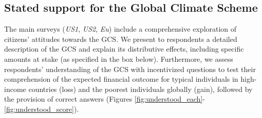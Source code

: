 \begin{bibunit}



\subsection{Stated support for the Global Climate Scheme}\label{subsec:gcs_stated_support}

The main surveys (\textit{US1}, \textit{US2}, \textit{Eu}) include a comprehensive exploration of citizens' attitudes towards the GCS. We present to respondents a detailed description of the GCS and explain its distributive effects, including specific amounts at stake (as specified in the box below). Furthermore, we assess respondents' understanding of the GCS with incentivized questions to test their comprehension of the expected financial outcome for typical individuals in high-income countries (loss) and the poorest individuals globally (gain), followed by the provision of correct answers (Figures \ref{fig:understood_each}-\ref{fig:understood_score}). %


\end{bibunit}
